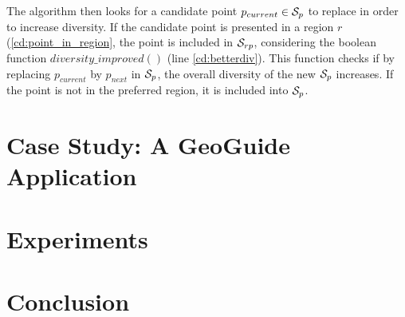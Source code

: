 \documentclass[runningheads,a4paper]{llncs}
\begin{document}
The algorithm then looks for a candidate point $p_{current} \in {\cal S}_p$ to replace in order to increase diversity. If the candidate point is presented in a region $r$ (\ref{cd:point_in_region}, the point is included in ${\cal S}_{rp}$, considering the boolean function $\mathit{diversity\_improved}()$ (line \ref{cd:betterdiv}). This function checks if by replacing $p_{current}$ by $p_{next}$ in ${\cal S}_p$, the overall diversity of the new ${\cal S}_p$ increases. If the point is not in the preferred region, it is included into ${\cal S}_p$.

\section{Case Study: A GeoGuide Application}

\section{Experiments}


\section{Conclusion}





\vspace{-5pt}



\end{document}
